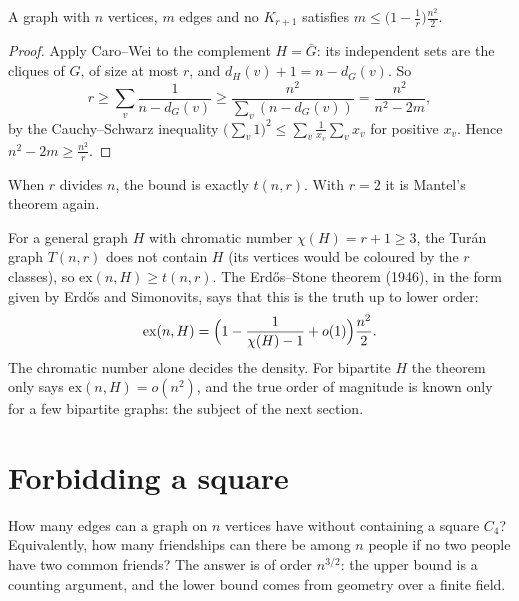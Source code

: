 \begin{proposition}\label{prop:turanprob}
A graph with $n$ vertices, $m$ edges and no $K_{r+1}$ satisfies $m\le\bigl(1-\frac1r\bigr)\frac{n^2}2$.
\end{proposition}
\begin{proof}
Apply Caro--Wei to the complement $H=\bar G$: its independent sets are the cliques of $G$, of size at most $r$, and $d_H(v)+1=n-d_G(v)$. So
\[
r\ge\sum_v\frac1{n-d_G(v)}\ge\frac{n^2}{\sum_v(n-d_G(v))}=\frac{n^2}{n^2-2m},
\]
by the Cauchy--Schwarz inequality $\bigl(\sum_v1\bigr)^2\le\sum_v\frac1{x_v}\sum_vx_v$ for positive $x_v$. Hence $n^2-2m\ge\frac{n^2}r$.
\end{proof}

When $r$ divides $n$, the bound is exactly $t(n,r)$. With $r=2$ it is Mantel's theorem again.

\begin{remark}
For a general graph $H$ with chromatic number $\chi(H)=r+1\ge3$, the Tur\'an graph $T(n,r)$ does not contain $H$ (its vertices would be coloured by the
$r$ classes), so $\mathrm{ex}(n,H)\ge t(n,r)$. The Erd\H os--Stone theorem (1946), in the form given by Erd\H os and Simonovits, says that this is the truth
up to lower order:
\[
\mathrm{ex}(n,H)=\Bigl(1-\frac1{\chi(H)-1}+o(1)\Bigr)\frac{n^2}2.
\]
The chromatic number alone decides the density. For bipartite $H$ the theorem only says $\mathrm{ex}(n,H)=o(n^2)$, and the true order of magnitude is
known only for a few bipartite graphs: the subject of the next section.
\end{remark}

\section{Forbidding a square}

How many edges can a graph on $n$ vertices have without containing a square $C_4$? Equivalently, how many friendships can there be among $n$
people if no two people have two common friends? The answer is of order $n^{3/2}$: the upper bound is a counting argument, and the lower bound comes
from geometry over a finite field.

